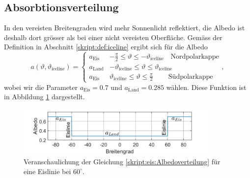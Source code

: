 \begin{refsection}
\subsection{Absorbtionsverteilung}
In den vereisten Breitengraden wird mehr Sonnenlicht reflektiert, die Albedo ist deshalb dort grösser als bei einer nicht vereisten Oberfläche. Gemäss der Definition in Abschnitt \ref{skript:def:iceline} ergibt sich für die Albedo
\begin{equation}\label{skript:eis:Albedoverteilung}
a(\vartheta,\vartheta_\text{iceline})
=
\begin{cases}
	a_\text{Eis}&-\tfrac{\pi}{2}\leq\vartheta\leq-\vartheta_\text{iceline}\quad\text{Nordpolarkappe}\\
	a_\text{Land}&-\vartheta_\text{iceline}\leq\vartheta\leq\vartheta_\text{iceline} \\
	a_\text{Eis}&\vartheta_\text{iceline}\leq\vartheta\leq\tfrac{\pi}{2}\qquad\>\text{Südpolarkappe}
\end{cases},
\end{equation}
wobei wir die Parameter $a_\text{Eis}=0.7$ und $a_\text{Land}=0.285$ wählen. Diese Funktion ist in Abbildung \ref{skript:eis:fig:Albedoverteilung} dargestellt.
\begin{figure}
	\centering
	\includegraphics[width=10cm]{eis/Albedo_abh_Breitengrad.jpg}
	\caption{Veranschaulichung der Gleichung \eqref{skript:eis:Albedoverteilung} für eine Eislinie bei $60^\circ$.}
	\label{skript:eis:fig:Albedoverteilung}
\end{figure}

\end{refsection}
